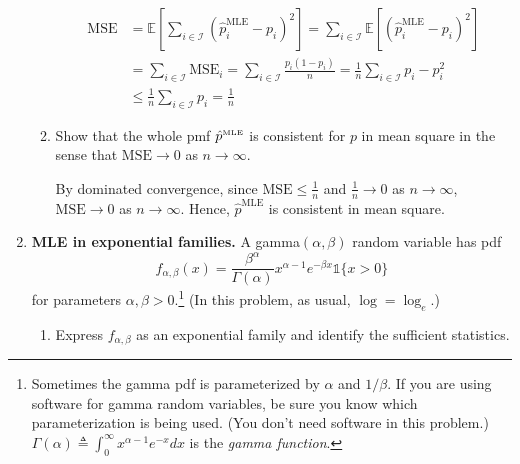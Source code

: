 \documentclass[11pt]{report}
\newcommand{\ind}{{\mathds{1}}}
\newcommand{\teq}{\triangleq}
\newcommand{\E}{\mathbb{E}}
\begin{document}
\begin{enumerate}[1.]
\begin{enumerate}
                    \color{blue}
                    \begin{align*}
                        \text{MSE} & = \E\left[\sum_{i \in \mathcal I} (\hat p_i^{\text{MLE}} - p_i)^2\right]
                        = \sum_{i \in \mathcal I} \E[(\hat p_i^{\text{MLE}} - p_i)^2]                         \\
                                   & = \sum_{i \in \mathcal I} \text{MSE}_i
                        = \sum_{i \in \mathcal I} \frac{p_i(1 - p_i)}{n}
                        = \frac{1}{n} \sum_{i \in \mathcal I} p_i - p_i^2                                     \\
                                   & \leq \frac{1}{n} \sum_{i \in \mathcal I} p_i = \frac{1}{n}
                    \end{align*}
                    \color{black}


              \item Show that the whole pmf $\hat p^{\text{\tiny MLE}}$ is consistent for $p$ in mean square in the sense that $\text{MSE}\to 0$ as $n\to\infty$.

                    \color{blue}
                    By dominated convergence, since $\text{MSE} \leq \frac{1}{n}$ and $\frac{1}{n} \to 0$ as $n \to \infty$, $\text{MSE} \to 0$ as $n \to \infty$. Hence, $\hat p^{\text{MLE}}$ is consistent in mean square.
                    \color{black}

          \end{enumerate}




          \pagebreak



    \item {\bf MLE in exponential families.} A gamma$(\alpha,\beta)$ random variable has pdf
          \[ f_{\alpha,\beta}(x) = \frac{\beta^\alpha}{\Gamma(\alpha)}x^{\alpha-1}e^{-\beta x} \ind\{x > 0\} \]
          for parameters $\alpha,\beta > 0$.\footnote{Sometimes the gamma pdf is parameterized by $\alpha$ and $1/\beta$. If you are using software for gamma random variables, be sure you know which parameterization is being used.  (You don't need software in this problem.) $\Gamma(\alpha)\teq\int_0^\infty x^{\alpha-1} e^{-x} dx$ is the {\em gamma function}.} (In this problem, as usual, $\log=\log_e$.)
          \begin{enumerate}
              \item Express $f_{\alpha,\beta}$ as an exponential family and identify the sufficient statistics.


\end{enumerate}
\end{enumerate}
\end{document}
